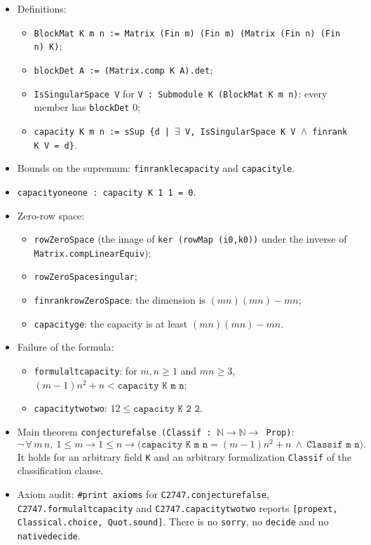 \documentclass[11pt]{article}
\renewcommand{\_}{\oldus\allowbreak}
\theoremstyle{definition}
\theoremstyle{remark}
\begin{document}
\begin{itemize}
\item Definitions:
  \begin{itemize}
  \item \texttt{BlockMat K m n := Matrix (Fin m) (Fin m) (Matrix (Fin n) (Fin n) K)};
  \item \texttt{blockDet A := (Matrix.comp \_ \_ \_ \_ K A).det};
  \item \texttt{IsSingularSpace V} for \texttt{V : Submodule K (BlockMat K m n)}: every member has
  \texttt{blockDet} $0$;
  \item \texttt{capacity K m n := sSup \{d | $\exists$ V, IsSingularSpace K V $\wedge$ finrank K V = d\}}.
  \end{itemize}
\item Bounds on the supremum: \texttt{finrank\_le\_capacity} and \texttt{capacity\_le}.
\item \texttt{capacity\_one\_one : capacity K 1 1 = 0}.
\item Zero-row space:
  \begin{itemize}
  \item \texttt{rowZeroSpace} (the image of \texttt{ker (rowMap (i0,k0))} under the inverse of
  \texttt{Matrix.compLinearEquiv});
  \item \texttt{rowZeroSpace\_singular};
  \item \texttt{finrank\_rowZeroSpace}: the dimension is $(mn)(mn)-mn$;
  \item \texttt{capacity\_ge}: the capacity is at least $(mn)(mn)-mn$.
  \end{itemize}
\item Failure of the formula:
  \begin{itemize}
  \item \texttt{formula\_lt\_capacity}: for $m,n\ge1$ and $mn\ge3$,
  $(m-1)n^2+n<\texttt{capacity K m n}$;
  \item \texttt{capacity\_two\_two}: $12\le\texttt{capacity K 2 2}$.
  \end{itemize}
\item Main theorem \texttt{conjecture\_false (Classif : $\mathbb N\to\mathbb N\to$ Prop)}:
\[
\neg\,\forall\, m\,n,\ 1\le m\to 1\le n\to
\bigl(\texttt{capacity K m n}=(m-1)n^2+n\ \wedge\ \texttt{Classif m n}\bigr).
\]
It holds for an arbitrary field \texttt{K} and an arbitrary formalization \texttt{Classif} of the
classification clause.
\item Axiom audit: \texttt{\#print axioms} for \texttt{C2747.conjecture\_false},
\texttt{C2747.formula\_lt\_capacity} and \texttt{C2747.capacity\_two\_two} reports
\texttt{[propext, Classical.choice, Quot.sound]}. There is no \texttt{sorry}, no \texttt{decide} and no
\texttt{native\_decide}.
\end{itemize}
\end{document}
